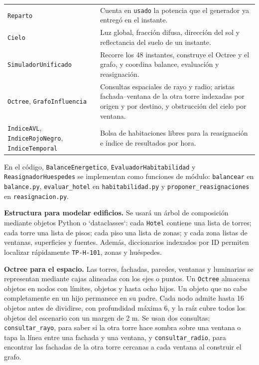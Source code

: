 \documentclass[12pt,a4paper]{article}
\newcommand{\clase}[1]{\texttt{#1}}
\newcommand{\codigo}[1]{\texttt{#1}}
\begin{document}
\begin{center}
\begin{tabular}{p{}p{}}
\clase{Reparto} & Cuenta en \codigo{usado} la potencia que el generador ya entregó en el instante.\\
\clase{Cielo} & Luz global, fracción difusa, dirección del sol y reflectancia del suelo de un instante.\\
\clase{SimuladorUnificado} & Recorre los 48 instantes, construye el Octree y el grafo, y coordina balance, evaluación y reasignación.\\
\clase{Octree}, \clase{GrafoInfluencia} & Consultas espaciales de rayo y radio; aristas fachada--ventana de la otra torre indexadas por origen y por destino, y obstrucción del cielo por ventana.\\
\clase{IndiceAVL}, \clase{IndiceRojoNegro}, \clase{IndiceTemporal} & Bolsa de habitaciones libres para la reasignación e índice de resultados por hora.\\
\bottomrule
\end{tabular}
\end{center}

En el código, \clase{BalanceEnergetico}, \clase{EvaluadorHabitabilidad} y \clase{ReasignadorHuespedes} se implementan como funciones de módulo: \codigo{balancear} en \codigo{balance.py}, \codigo{evaluar\_hotel} en \codigo{habitabilidad.py} y \codigo{proponer\_reasignaciones} en \codigo{reasignacion.py}.

\textbf{Estructura para modelar edificios.} Se usará un árbol de composición mediante objetos Python o `dataclasses`: cada \clase{Hotel} contiene una lista de torres; cada torre una lista de pisos; cada piso una lista de zonas; y cada zona listas de ventanas, superficies y fuentes. Además, diccionarios indexados por ID permiten localizar rápidamente \codigo{TP-H-101}, zonas y huéspedes.

\textbf{Octree para el espacio.} Las torres, fachadas, paredes, ventanas y luminarias se representan mediante cajas alineadas con los ejes o puntos. Un \clase{Octree} almacena objetos en nodos con límites, objetos y hasta ocho hijos. Un objeto que no cabe completamente en un hijo permanece en su padre. Cada nodo admite hasta 16 objetos antes de dividirse, con profundidad máxima 6, y la raíz cubre todos los objetos del escenario con un margen de 2 m. Se usan dos consultas: \codigo{consultar\_rayo}, para saber si la otra torre hace sombra sobre una ventana o tapa la línea entre una fachada y una ventana, y \codigo{consultar\_radio}, para encontrar las fachadas de la otra torre cercanas a cada ventana al construir el grafo.
\end{document}
